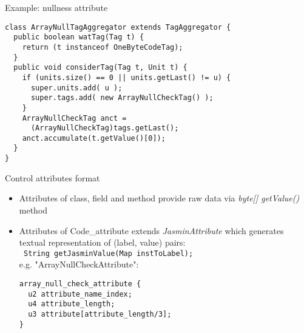\begin{slide}{Example: nullness attribute}
\scriptsize{
\begin{verbatim}
class ArrayNullTagAggregator extends TagAggregator {
  public boolean watTag(Tag t) {
    return (t instanceof OneByteCodeTag);
  }
  public void considerTag(Tag t, Unit t) {
    if (units.size() == 0 || units.getLast() != u) {
      super.units.add( u );
      super.tags.add( new ArrayNullCheckTag() );
    }
    ArrayNullCheckTag anct = 
      (ArrayNullCheckTag)tags.getLast();
    anct.accumulate(t.getValue()[0]);  
  }
}
\end{verbatim}
}
\end{slide}

\begin{slide}{Control attributes format}
\begin{itemize}
\item Attributes of class, field and method provide raw data 
      via {\em byte[] getValue()} method
\item Attributes of Code\_attribute extends {\em JasminAttribute}
      which generates textual representation of (label, value)
      pairs:\\
\footnotesize{\verb$ String getJasminValue(Map instToLabel); $} \\
e.g. "ArrayNullCheckAttribute":
\footnotesize{
\begin{verbatim}
array_null_check_attribute {
  u2 attribute_name_index;
  u4 attribute_length;
  u3 attribute[attribute_length/3];
}
\end{verbatim}
}
\end{itemize}
\end{slide}
